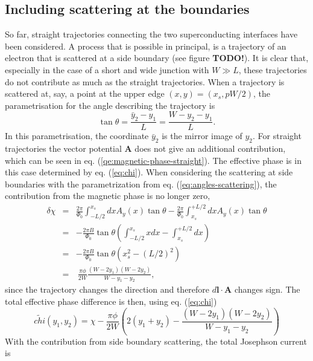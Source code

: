 \subsection*{Including scattering at the boundaries}

So far, straight trajectories connecting the two superconducting interfaces have been considered. A process that is possible in principal, is a trajectory of an electron that is scattered at a side boundary (see figure \textbf{TODO!}). It is clear that, especially in the case of a short and wide junction with $W \gg L$, these trajectories do not contribute as much as the straight trajectories. When a trajectory is scattered at, say, a point at the upper edge $(x, y) = (x_s, p W/2)$, the parametrisation for the angle describing the trajectory is
\begin{equation}
\tan \theta = \frac{\bar{y}_2 - y_1}{L} = \frac{W - y_2 - y_1}{L}. \label{eq:angles-scattering}
\end{equation}
In this parametrisation, the coordinate $\bar{y}_2$ is the mirror image of $y_2$. For straight trajectories the vector potential $\mathbf{A}$ does not give an additional contribution, which can be seen in eq. (\ref{qe:magnetic-phase-straight}). The effective phase is in this case determined by eq. (\ref{eq:chi}). When considering the scattering at side boundaries with the parametrization from eq. (\ref{eq:angles-scattering}), the contribution from the magnetic phase is no longer zero,
\begin{eqnarray}
\delta \chi &=& \frac{2 \pi}{\Phi_0} \int_{-L/2}^{x_s} dx A_y(x) \tan \theta  - \frac{2 \pi}{\Phi_0} \int_{x_s}^{+L/2} dx A_y(x) \tan \theta \\
&=& - \frac{2 \pi B }{\Phi_0 } \tan \theta \left( \int_{-L/2}^{x_s} x dx - \int_{x_s}^{+L/2} dx \right) \\
&=& - \frac{2 \pi B}{\Phi_0 } \tan \theta \left( x_s^2 - (L/2)^2 \right) \\
&=& ~ \frac{\pi \phi}{2 W} \frac{(W - 2 y_1) ( W - 2y_2)}{W - y_1 - y_2},
\end{eqnarray}
since the trajectory changes the direction and therefore $d \mathbf{l} \cdot \mathbf{A}$ changes sign. The total effective phase difference is then, using eq. (\ref{eq:chi})
\begin{equation}
\tilde{chi} (y_1, y_2) = \chi - \frac{\pi \phi}{2 W} \left( 2 (y_1 + y_2) - \frac{(W-2y_1)(W-2y_2)}{W - y_1 - y_2} \right)
\end{equation}
With the contribution from side boundary scattering, the total Josephson current is
